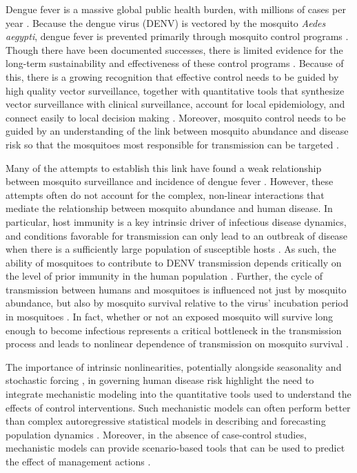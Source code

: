 \documentclass[10pt,letterpaper]{article}
\begin{document}
Dengue fever is a massive global public health burden, with millions of cases per year \cite{Bhatt2013}.  
Because the dengue virus (DENV) is vectored by the mosquito \textit{Aedes aegypti}, dengue fever is prevented primarily through mosquito control programs \cite{Achee2015}.
Though there have been documented successes, there is limited evidence for the long-term sustainability and effectiveness of these control programs \cite{Morrison2008}.
Because of this, there is a growing recognition that effective control needs to be guided by high quality vector surveillance, together with quantitative tools that synthesize vector surveillance with clinical surveillance, account for local epidemiology, and connect easily to local decision making \cite{Morrison2008, Scott2010b}.
Moreover, mosquito control needs to be guided by an understanding of the link between mosquito abundance and disease risk so that the mosquitoes most responsible for transmission can be targeted \cite{Scott2010a, Scott2010b}.

Many of the attempts to establish this link have found a weak relationship between mosquito surveillance and incidence of dengue fever \cite{Bowman2014, Pepin2015, Cromwell2017}.
However, these attempts often do not account for the complex, non-linear interactions that mediate the relationship between mosquito abundance and human disease.
In particular, host immunity is a key intrinsic driver of infectious disease dynamics, and conditions favorable for transmission can only lead to an outbreak of disease when there is a sufficiently large population of susceptible hosts \cite{Koelle2004, Koelle2005}.
As such, the ability of mosquitoes to contribute to DENV transmission depends critically on the level of prior immunity in the human population \cite{Scott2010a}.
Further, the cycle of transmission between humans and mosquitoes is influenced not just by mosquito abundance, but also by mosquito survival relative to the virus' incubation period in mosquitoes \cite{Smith2012}.
In fact, whether or not an exposed mosquito will survive long enough to become infectious represents a critical bottleneck in the transmission process and leads to nonlinear dependence of transmission on mosquito survival \cite{Smith2012}.

The importance of intrinsic nonlinearities, potentially alongside seasonality and stochastic forcing \cite{Ellner1998, Koelle2004, Grenfell2002}, in governing human disease risk highlight the need to integrate mechanistic modeling into the quantitative tools used to understand the effects of control interventions.
Such mechanistic models can often perform better than complex autoregressive statistical models in describing and forecasting population dynamics \cite{Reilly2005}.
Moreover, in the absence of case-control studies, mechanistic models can provide scenario-based tools that can be used to predict the effect of management actions \cite{Buckland2007}.
\end{document}
